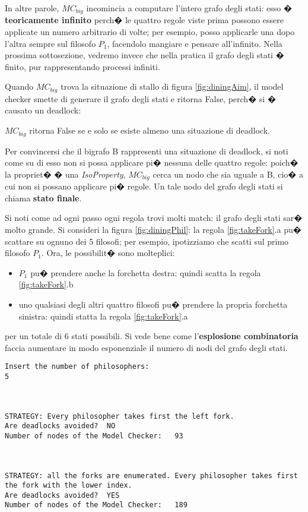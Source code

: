 In altre parole, $MC_{big}$ incomincia a computare l'intero grafo degli stati: esso � \textbf{teoricamente infinito} perch� le quattro regole viste prima possono essere applicate un numero arbitrario di volte; per esempio, posso applicarle una dopo l'altra sempre sul filosofo $P_1$, facendolo mangiare e pensare all'infinito. Nella prossima sottosezione, vedremo invece che nella pratica il grafo degli stati � finito, pur rappresentando processi infiniti. 

Quando $MC_{big}$ trova la situazione di stallo di figura \ref{fig:diningAim}, il model checker smette di generare il grafo degli stati e ritorna False, perch� si � causato un deadlock:
\begin{prop}
$MC_{big}$ ritorna False se e solo se esiste almeno una situazione di deadlock.
\end{prop}

Per convincersi che il bigrafo B rappresenti una situazione di deadlock, si noti come su di esso non si possa applicare pi� nessuna delle quattro regole: poich� la propriet� � una \emph{IsoProperty}, $MC_{big}$ cerca un nodo che sia uguale a B, cio� a cui non si possano applicare pi� regole. Un tale nodo del grafo degli stati si chiama \textbf{stato finale}.

Si noti come ad ogni passo ogni regola trovi molti match: il grafo degli stati sar� molto grande. Si consideri la figura \ref{fig:diningPhil}: la regola \ref{fig:takeFork}.a pu� scattare su ognuno dei 5 filosofi; per esempio, ipotizziamo che scatti sul primo filosofo $P_1$. Ora, le possibilit� sono molteplici:
\begin{itemize}
	\item
	$P_1$ pu� prendere anche la forchetta destra: quindi scatta la regola \ref{fig:takeFork}.b
	\item
	uno qualsiasi degli altri quattro filosofi pu� prendere la propria forchetta sinistra: quindi statta la regola \ref{fig:takeFork}.a
\end{itemize}
per un totale di 6 stati possibili. Si vede bene come l'\textbf{esplosione combinatoria} faccia aumentare in modo esponenziale il numero di nodi del grafo degli stati. \\ 

\begin{lstlisting}
Insert the number of philosophers: 
5



STRATEGY: Every philosopher takes first the left fork.
Are deadlocks avoided?	NO
Number of nodes of the Model Checker:	93



STRATEGY: all the forks are enumerated. Every philosopher takes first the fork with the lower index.
Are deadlocks avoided?	YES
Number of nodes of the Model Checker:	189
\end{lstlisting}

